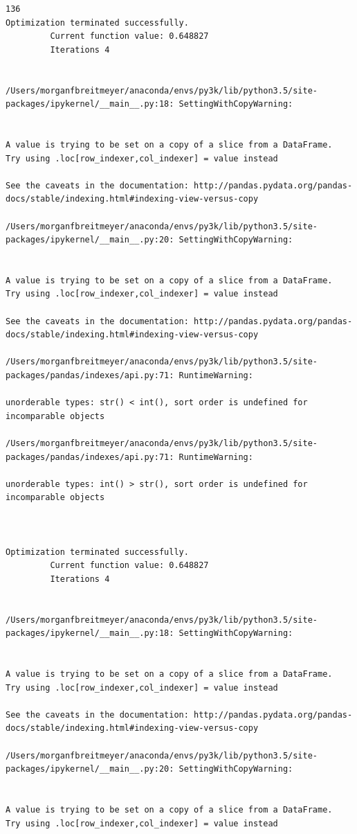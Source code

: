 \begin{lstlisting}
136
Optimization terminated successfully.
         Current function value: 0.648827
         Iterations 4


/Users/morganfbreitmeyer/anaconda/envs/py3k/lib/python3.5/site-packages/ipykernel/__main__.py:18: SettingWithCopyWarning:


A value is trying to be set on a copy of a slice from a DataFrame.
Try using .loc[row_indexer,col_indexer] = value instead

See the caveats in the documentation: http://pandas.pydata.org/pandas-docs/stable/indexing.html#indexing-view-versus-copy

/Users/morganfbreitmeyer/anaconda/envs/py3k/lib/python3.5/site-packages/ipykernel/__main__.py:20: SettingWithCopyWarning:


A value is trying to be set on a copy of a slice from a DataFrame.
Try using .loc[row_indexer,col_indexer] = value instead

See the caveats in the documentation: http://pandas.pydata.org/pandas-docs/stable/indexing.html#indexing-view-versus-copy

/Users/morganfbreitmeyer/anaconda/envs/py3k/lib/python3.5/site-packages/pandas/indexes/api.py:71: RuntimeWarning:

unorderable types: str() < int(), sort order is undefined for incomparable objects

/Users/morganfbreitmeyer/anaconda/envs/py3k/lib/python3.5/site-packages/pandas/indexes/api.py:71: RuntimeWarning:

unorderable types: int() > str(), sort order is undefined for incomparable objects



Optimization terminated successfully.
         Current function value: 0.648827
         Iterations 4


/Users/morganfbreitmeyer/anaconda/envs/py3k/lib/python3.5/site-packages/ipykernel/__main__.py:18: SettingWithCopyWarning:


A value is trying to be set on a copy of a slice from a DataFrame.
Try using .loc[row_indexer,col_indexer] = value instead

See the caveats in the documentation: http://pandas.pydata.org/pandas-docs/stable/indexing.html#indexing-view-versus-copy

/Users/morganfbreitmeyer/anaconda/envs/py3k/lib/python3.5/site-packages/ipykernel/__main__.py:20: SettingWithCopyWarning:


A value is trying to be set on a copy of a slice from a DataFrame.
Try using .loc[row_indexer,col_indexer] = value instead


\end{lstlisting}
